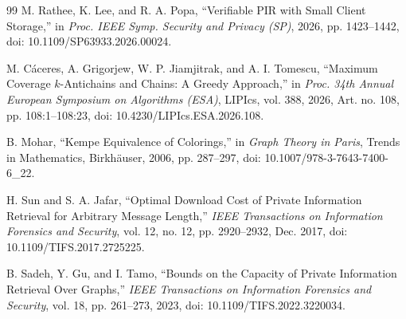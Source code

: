 \begin{thebibliography}{99}
M. Rathee, K. Lee, and R. A. Popa,
\newblock ``Verifiable PIR with Small Client Storage,''
\newblock in \emph{Proc. IEEE Symp. Security and Privacy (SP)}, 2026, pp. 1423--1442, doi: 10.1109/SP63933.2026.00024.

M. C\'aceres, A. Grigorjew, W. P. Jiamjitrak, and A. I. Tomescu,
\newblock ``Maximum Coverage $k$-Antichains and Chains: A Greedy Approach,''
\newblock in \emph{Proc. 34th Annual European Symposium on Algorithms (ESA)}, LIPIcs, vol. 388, 2026, Art. no. 108, pp. 108:1--108:23, doi: 10.4230/LIPIcs.ESA.2026.108.

B. Mohar,
\newblock ``Kempe Equivalence of Colorings,''
\newblock in \emph{Graph Theory in Paris}, Trends in Mathematics, Birkh\"auser, 2006, pp. 287--297, doi: 10.1007/978-3-7643-7400-6\_22.

H. Sun and S. A. Jafar,
\newblock ``Optimal Download Cost of Private Information Retrieval for Arbitrary Message Length,''
\newblock \emph{IEEE Transactions on Information Forensics and Security}, vol. 12, no. 12, pp. 2920--2932, Dec. 2017, doi: 10.1109/TIFS.2017.2725225.

B. Sadeh, Y. Gu, and I. Tamo,
\newblock ``Bounds on the Capacity of Private Information Retrieval Over Graphs,''
\newblock \emph{IEEE Transactions on Information Forensics and Security}, vol. 18, pp. 261--273, 2023, doi: 10.1109/TIFS.2022.3220034.

\end{thebibliography}
